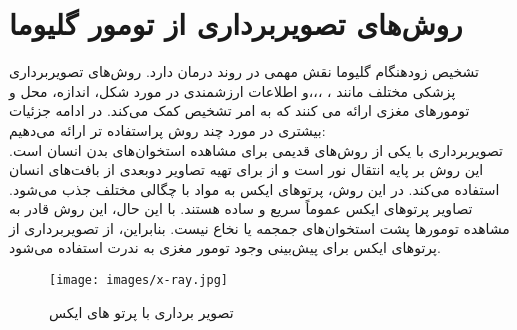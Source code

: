 \section{روش‌های تصویربرداری از تومور گلیوما}
تشخیص زودهنگام گلیوما نقش مهمی در روند درمان دارد. روش‌های تصویربرداری پزشکی مختلف مانند  ، ،،،و  اطلاعات ارزشمندی در مورد شکل، اندازه، محل و  تومورهای مغزی ارائه می کنند که به امر تشخیص کمک می‌کند. در ادامه جزئیات بیشتری در مورد چند روش پراستفاده تر ارائه می‌دهیم: \\
تصویربرداری با   یکی از روش‌های قدیمی برای مشاهده استخوان‌های بدن انسان است. این روش بر پایه انتقال نور است و از  برای تهیه تصاویر دوبعدی از بافت‌های انسان استفاده می‌کند. در این روش، پرتوهای ایکس به مواد با چگالی مختلف جذب می‌شود. تصاویر پرتوهای ایکس عموماً سریع و ساده هستند. با این حال، این روش قادر به مشاهده تومورها پشت استخوان‌های جمجمه یا نخاع نیست. بنابراین، از تصویربرداری از پرتوهای ایکس برای پیش‌بینی وجود تومور مغزی به ندرت استفاده می‌شود.
\begin{figure}[ht]
\centerline{\texttt{[image: images/x-ray.jpg]}}
\caption[تصویر برداری با پرتو های ایکس]{تصویر برداری با پرتو های ایکس\cite{ranjbarzadeh}}
\label{fig:x-ray}
\end{figure}

